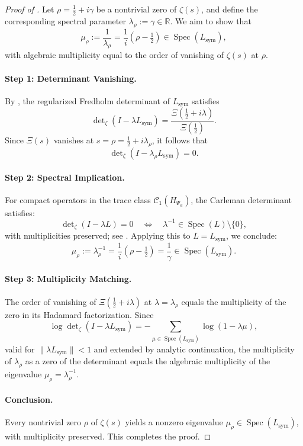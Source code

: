 \begin{proof}[Proof of ]
Let \( \rho = \tfrac{1}{2} + i\gamma \) be a nontrivial zero of \( \zeta(s) \), and define the corresponding spectral parameter \( \lambda_\rho := \gamma \in \mathbb{R} \). We aim to show that
\[
\mu_\rho := \frac{1}{\lambda_\rho} = \frac{1}{i}(\rho - \tfrac{1}{2}) \in \operatorname{Spec}(L_{\mathrm{sym}}),
\]
with algebraic multiplicity equal to the order of vanishing of \( \zeta(s) \) at \( \rho \).

\paragraph{Step 1: Determinant Vanishing.}
By , the regularized Fredholm determinant of \( L_{\mathrm{sym}} \) satisfies
\[
\det\nolimits_\zeta(I - \lambda L_{\mathrm{sym}}) = \frac{\Xi(\tfrac{1}{2} + i\lambda)}{\Xi(\tfrac{1}{2})}.
\]
Since \( \Xi(s) \) vanishes at \( s = \rho = \tfrac{1}{2} + i\lambda_\rho \), it follows that
\[
\det\nolimits_\zeta(I - \lambda_\rho L_{\mathrm{sym}}) = 0.
\]

\paragraph{Step 2: Spectral Implication.}
For compact operators in the trace class \( \mathcal{C}_1(H_{\Psi_\alpha}) \), the Carleman determinant satisfies:
\[
\det\nolimits_\zeta(I - \lambda L) = 0 \quad \Longleftrightarrow \quad \lambda^{-1} \in \operatorname{Spec}(L) \setminus \{0\},
\]
with multiplicities preserved; see \cite[Ch.~3]{Simon2005TraceIdeals}. Applying this to \( L = L_{\mathrm{sym}} \), we conclude:
\[
\mu_\rho := \lambda_\rho^{-1} = \frac{1}{i}(\rho - \tfrac{1}{2}) = \frac{1}{\gamma} \in \operatorname{Spec}(L_{\mathrm{sym}}).
\]

\paragraph{Step 3: Multiplicity Matching.}
The order of vanishing of \( \Xi(\tfrac{1}{2} + i\lambda) \) at \( \lambda = \lambda_\rho \) equals the multiplicity of the zero in its Hadamard factorization. Since
\[
\log \det\nolimits_\zeta(I - \lambda L_{\mathrm{sym}}) = -\sum_{\mu \in \operatorname{Spec}(L_{\mathrm{sym}})} \log(1 - \lambda \mu),
\]
valid for \( \| \lambda L_{\mathrm{sym}} \| < 1 \) and extended by analytic continuation, the multiplicity of \( \lambda_\rho \) as a zero of the determinant equals the algebraic multiplicity of the eigenvalue \( \mu_\rho = \lambda_\rho^{-1} \).

\paragraph{Conclusion.}
Every nontrivial zero \( \rho \) of \( \zeta(s) \) yields a nonzero eigenvalue \( \mu_\rho \in \operatorname{Spec}(L_{\mathrm{sym}}) \), with multiplicity preserved. This completes the proof.
\end{proof}
